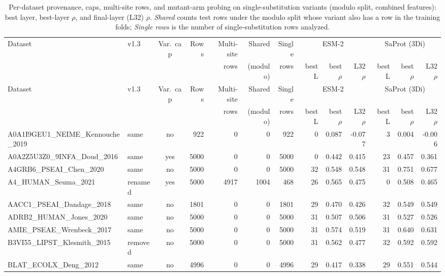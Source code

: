 \documentclass[11pt,a4paper]{article}
\begin{document}
\begin{landscape}\footnotesize
\begin{longtable}{llcrrrrrrrrrr}
\caption{Per-dataset provenance, caps, multi-site rows, and mutant-arm probing on single-substitution variants (modulo split, combined features): best layer, best-layer $\rho$, and final-layer (L32) $\rho$. \emph{Shared} counts test rows under the modulo split whose variant also has a row in the training folds; \emph{Single rows} is the number of single-substitution rows analyzed.}\label{tab:S1}\\
\toprule
Dataset & v1.3 & Var.\ cap & Rows & Multi-site & Shared & Single & \multicolumn{3}{c}{ESM-2} & \multicolumn{3}{c}{SaProt (3Di)} \\
 & & & & rows & (modulo) & rows & best L & best $\rho$ & L32 $\rho$ & best L & best $\rho$ & L32 $\rho$ \\
\midrule\endfirsthead
\toprule
Dataset & v1.3 & Var.\ cap & Rows & Multi-site & Shared & Single & \multicolumn{3}{c}{ESM-2} & \multicolumn{3}{c}{SaProt (3Di)} \\
 & & & & rows & (modulo) & rows & best L & best $\rho$ & L32 $\rho$ & best L & best $\rho$ & L32 $\rho$ \\
\midrule\endhead
\bottomrule\endfoot
A0A1I9GEU1\_NEIME\_Kennouche\_2019 & same & no & 922 & 0 & 0 & 922 & 0 & 0.087 & -0.077 & 3 & 0.004 & -0.006 \\
A0A2Z5U3Z0\_9INFA\_Doud\_2016 & same & yes & 5000 & 0 & 0 & 5000 & 0 & 0.442 & 0.415 & 23 & 0.457 & 0.361 \\
A4GRB6\_PSEAI\_Chen\_2020 & same & no & 5000 & 0 & 0 & 5000 & 32 & 0.548 & 0.548 & 31 & 0.751 & 0.677 \\
A4\_HUMAN\_Seuma\_2021 & renamed & yes & 5000 & 4917 & 1004 & 468 & 26 & 0.565 & 0.475 & 0 & 0.508 & 0.465 \\
AACC1\_PSEAI\_Dandage\_2018 & same & no & 1801 & 0 & 0 & 1801 & 29 & 0.470 & 0.426 & 32 & 0.549 & 0.549 \\
ADRB2\_HUMAN\_Jones\_2020 & same & no & 5000 & 0 & 0 & 5000 & 31 & 0.507 & 0.506 & 31 & 0.527 & 0.526 \\
AMIE\_PSEAE\_Wrenbeck\_2017 & same & no & 5000 & 0 & 0 & 5000 & 31 & 0.574 & 0.519 & 31 & 0.640 & 0.631 \\
B3VI55\_LIPST\_Klesmith\_2015 & removed & no & 5000 & 0 & 0 & 5000 & 31 & 0.562 & 0.477 & 32 & 0.592 & 0.592 \\
BLAT\_ECOLX\_Deng\_2012 & same & no & 4996 & 0 & 0 & 4996 & 29 & 0.417 & 0.338 & 29 & 0.551 & 0.544 \\

\end{longtable}
\end{landscape}
\end{document}
